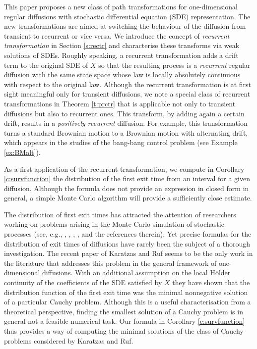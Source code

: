 \documentclass[11pt,reqno]{amsart}
\numberwithin{equation}{section}
\begin{document}
  This paper proposes a new class of path transformations for  one-dimensional regular diffusions with stochastic differential equation (SDE) representation. The new transformations are aimed at switching the behaviour of the diffusion  from transient to recurrent or vice versa.   We introduce the concept of  {\em recurrent transformation} 
 in Section \ref{s:rectr} and characterise these transforms via weak solutions of SDEs. Roughly speaking, a recurrent transformation adds a drift term to the original SDE of $X$ so that the resulting process is a {\em recurrent} regular  diffusion with the same state space whose law is locally absolutely continuous with respect to the original law.  Although the recurrent transformation is  at first sight meaningful only for transient diffusions, we note a special class of recurrent transformations  in Theorem \ref{t:prctr} that is applicable not only to transient diffusions but also to recurrent ones. This transform, by adding again a certain drift, results in a {\em positively recurrent} diffusion. For example, this transformation turns a standard Brownian motion to a Brownian motion with alternating drift, which appears in the studies of the bang-bang control problem (see Example \ref{ex:BMalt}). 

As a first application of the recurrent transformation, we compute in   Corollary \ref{c:survfunction} the distribution of the  first exit time from an interval for a given diffusion.  Although the formula does not provide an expression in closed form in general,  a simple Monte Carlo algorithm will provide a sufficiently close estimate. 

The distribution of first exit times has attracted the attention of researchers working on problems arising in the Monte Carlo simulation of stochastic processes (see, e.g., \cite{baldi1995}, \cite{BCI}, \cite{GobetKilled}, \cite{GMkilled}, and the references therein). Yet precise formulas for the distribution of  exit times of diffusions  have rarely been the subject of a thorough investigation. The recent paper of Karatzas and Ruf \cite{KR} seems to be the only work in the literature that addresses this problem in the general framework of one-dimensional diffusions. With an additional assumption on the local H\"older continuity of the coefficients of the SDE satisfied by $X$ they have shown that the distribution function of the first exit time was the minimal nonnegative solution of a particular Cauchy problem. Although this is a useful characterisation from a theoretical perspective, finding the smallest solution of a Cauchy problem is in general not a feasible numerical task. Our formula in Corollary \ref{c:survfunction} thus provides a way of computing the minimal solutions of the class of Cauchy problems considered by Karatzas and Ruf.
\end{document}
